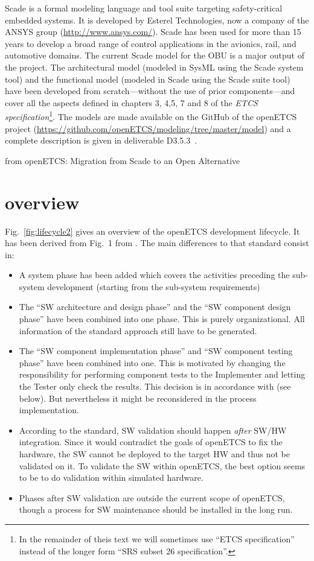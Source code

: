 \documentclass{template/openetcs_report}
\begin{document}
Scade is a formal modeling language and tool suite targeting
safety-critical embedded systems. It is developed by Esterel
Technologies, now a company of the ANSYS group
(\url{http://www.ansys.com/}). Scade has been used for more than 15
years to develop a broad range of control applications in the
avionics, rail, and automotive domains. The current Scade model for
the OBU is a major output of the project. The architectural model
(modeled in SysML using the Scade system tool) and the functional
model (modeled in Scade using the Scade suite tool) have been
developed from scratch---without the use of prior components---and
cover all the aspects defined in chapters 3, 4,5, 7 and 8 of the
\emph{ETCS specification}\footnote{In the remainder of theis text we
  will sometimes use ``ETCS specification'' instead of the longer form
  ``SRS subset 26 specification''.}. The models are made available on
the GitHub of the openETCS project
(\url{https://github.com/openETCS/modeling/tree/master/model}) and a
complete description is given in deliverable D3.5.3~\cite{d353}.

from openETCS: Migration from Scade to an Open Alternative


\section{overview}

Fig.~\ref{fig:lifecycle2} gives an overview of the openETCS
development lifecycle. It has been derived from Fig.~1 from
\cite{EN50128:2011}. The main differences to that standard consist in:
\begin{itemize}
\item A system phase has been added which covers the activities preceding
  the sub-system development (starting from the sub-system requirements)
\item The ``SW architecture and design phase'' and the ``SW component
  design phase'' have been combined into one phase. This is purely
  organizational. All information of the standard approach still have
  to be generated.
\item The ``SW component implementation phase'' and ``SW component
  testing phase'' have been combined into one. This is motivated by
  changing the responsibility for performing component tests to the
  Implementer and letting the Tester only check the results. This
  decision is in accordance with \cite[6.1.4.1 to
  6.1.4.5]{EN50128:2011} (see below). But nevertheless it might be
  reconsidered in the process implementation.
\item According to the standard, SW validation should happen
  \emph{after} SW/HW integration. Since it would contradict the goals
  of openETCS to fix the hardware, the SW cannot be deployed to the
  target HW and thus not be validated on it. To validate the SW within
  openETCS, the best option seems to be to do validation within
  simulated hardware.
\item Phases after SW validation are outside the current scope of
  openETCS, though a process for SW maintenance should be installed in
  the long run.
\end{itemize}
\end{document}
